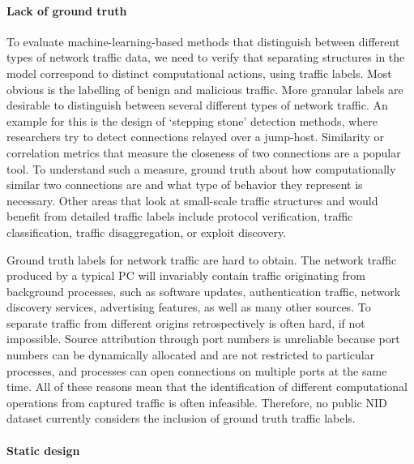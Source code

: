 \paragraph{Lack of ground truth}

To evaluate machine-learning-based methods that distinguish between different types of network traffic data, we need to verify that separating structures in the model correspond to distinct computational actions, using traffic labels. Most obvious is the labelling of benign and malicious traffic. More granular labels are desirable to distinguish between several different types of network traffic. An example for this is the design of `stepping stone' detection methods, where researchers try to detect connections relayed over a jump-host. Similarity or correlation metrics that measure the closeness of two connections are a popular tool. To understand such a measure, ground truth about how computationally similar two connections are and what type of behavior they represent is necessary. 
Other areas that look at small-scale traffic structures and would benefit from detailed traffic labels include protocol verification, traffic classification, traffic disaggregation, or exploit discovery.

Ground truth labels for network traffic are hard to obtain. The network traffic produced by a typical PC will invariably contain traffic originating from background processes, such as software updates, authentication traffic, network discovery services, advertising features, as well as many other sources. To separate traffic from different origins retrospectively is often hard, if not impossible. Source attribution through port numbers is unreliable because port numbers can be dynamically allocated and are not restricted to particular processes, and processes can open connections on multiple ports at the same time. 
All of these reasons mean that the identification of different computational operations from captured traffic is often infeasible. 
Therefore, no public NID dataset currently considers the inclusion of ground truth traffic labels.

\paragraph{Static design}

